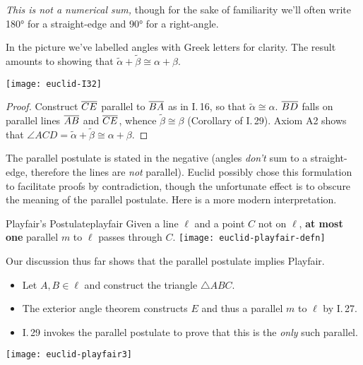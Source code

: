 \begin{minipage}[t]{0.64\linewidth}\vspace{-4pt}
	\emph{This is not a numerical sum,} though for the sake of familiarity we'll often write \ang{180} for a straight-edge and \ang{90} for a right-angle.\par
	In the picture we've labelled angles with Greek letters for clarity. The result amounts to showing that $\widetilde\alpha+\widetilde\beta\cong\alpha+\beta$.
\end{minipage}
\hfill
\begin{minipage}[t]{0.34\linewidth}\vspace{-9pt}
	\flushright
	\texttt{[image: euclid-I32]}
\end{minipage}

\vspace{-20pt}

\begin{proof}
	Construct $\overline{CE}$ parallel to $\overline{BA}$ as in I.\,16, so that $\widetilde\alpha\cong\alpha$.\smallbreak
	$\overline{BD}$ falls on parallel lines $\overline{AB}$ and $\overline{CE}$, whence $\widetilde\beta\cong\beta$ (Corollary of I.\,29).\smallbreak
	Axiom A2 shows that $\angle ACD=\widetilde\alpha+\widetilde\beta\cong\alpha+\beta$.
\end{proof}


\medskip


The parallel postulate is stated in the negative (angles \emph{don't} sum to a straight-edge, therefore the lines are \emph{not} parallel). Euclid possibly chose this formulation to facilitate proofs by contradiction, though the unfortunate effect is to obscure the meaning of the parallel postulate. Here is a more modern interpretation.

\begin{axiom}[lower separated=false, sidebyside, sidebyside align=top seam, sidebyside gap=0pt, righthand width=0.37\linewidth]{Playfair's Postulate}{playfair}
	Given a line $\ell$ and a point $C$ not on $\ell$, \textbf{at most one} parallel $m$ to $\ell$ passes through $C$.
	\tcblower
	\flushright
	\texttt{[image: euclid-playfair-defn]}
\end{axiom}


\begin{minipage}[t]{0.62\linewidth}\vspace{0pt}
	Our discussion thus far shows that the parallel postulate implies Playfair.
	\begin{itemize}\itemsep0pt
	  \item Let $A,B\in\ell$ and construct the triangle $\triangle ABC$.
	  \item The exterior angle theorem constructs $E$ and thus a parallel $m$ to $\ell$ by I.\,27.
	  \item I.\,29 invokes the parallel postulate to prove that this is the \emph{only} such parallel.
	\end{itemize}
\end{minipage}
\hfill
\begin{minipage}[t]{0.37\linewidth}\vspace{0pt}
	\flushright
	\texttt{[image: euclid-playfair3]}
\end{minipage}\bigbreak

